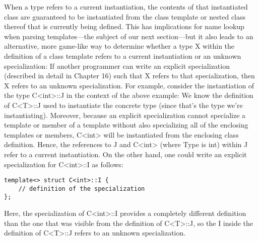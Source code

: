 When a type refers to a current instantiation, the contents of that instantiated class are guaranteed to be instantiated from the class template or nested class thereof that is currently being defined. This has implications for name lookup when parsing templates—the subject of our next section—but it also leads to an alternative, more game-like way to determine whether a type X within the definition of a class template refers to a current instantiation or an unknown specialization: If another programmer can write an explicit specialization (described in detail in Chapter 16) such that X refers to that specialization, then X refers to an unknown specialization. For example, consider the instantiation of the type C<int>::J in the context of the above example: We know the definition of C<T>::J used to instantiate the concrete type (since that’s the type we’re instantiating). Moreover, because an explicit specialization cannot specialize a template or member of a template without also specializing all of the enclosing templates or members, C<int> will be instantiated from the enclosing class definition. Hence, the references to J and C<int> (where Type is int) within J refer to a current instantiation. On the other hand, one could write an explicit specialization for C<int>::I as follows:

\begin{lstlisting}[style=styleCXX]
template<> struct C<int>::I {
	// definition of the specialization
};
\end{lstlisting}

Here, the specialization of C<int>::I provides a completely different definition than the one that was visible from the definition of C<T>::J, so the I inside the definition of C<T>::J refers to an unknown specialization.


